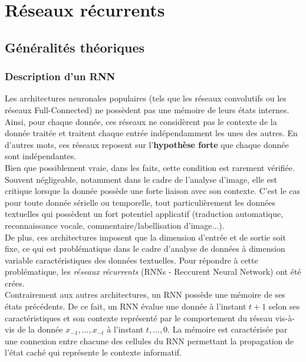 \section{Réseaux récurrents}
\label{recarchi}
\subsection{Généralités théoriques}
\subsubsection{Description d'un RNN}
\noindent Les architectures neuronales populaires (tels que les réseaux convolutifs ou les réseaux Full-Connected) ne possèdent pas une mémoire de leurs états internes. Ainsi, pour chaque donnée, ces réseaux ne considèrent pas le contexte de la donnée traitée et traitent chaque entrée indépendamment les unes des autres. En d'autres mots, ces réseaux reposent sur l'\textbf{hypothèse forte} que chaque donnée sont indépendantes.\\

\noindent Bien que possiblement vraie, dans les faits, cette condition est rarement vérifiée. Souvent négligeable, notamment dans le cadre de l'analyse d'image, elle est critique lorsque la donnée possède une forte liaison avec son contexte. C'est le cas pour toute donnée sérielle ou temporelle, tout particulièrement les données textuelles qui possèdent un fort potentiel applicatif (traduction automatique, reconnaissance vocale, commentaire/labellisation d'image...).\\

\noindent De plus, ces architectures imposent que la dimension d'entrée et de sortie soit fixe, ce qui est problématique dans le cadre d'analyse de données à dimension variable caractéristiques des données textuelles. Pour répondre à cette problématique, les \textit{réseaux récurrents}\cite{rnn} (RNNs - Reccurent Neural Network) ont été crées.\\

\noindent Contrairement aux autres architectures, un RNN possède une mémoire de ses états précédents. De ce fait, un RNN évalue une donnée à l'instant $t+1$ selon ses caractéristiques et son contexte représenté par le comportement du réseau vis-à-vis de la donnée $x_{-1},...,x_{-t}$ à l'instant $t,...,0$. La mémoire est caractérisée par une connexion entre chacune des cellules du RNN permettant la propagation de l'état caché qui représente le contexte informatif.\\


